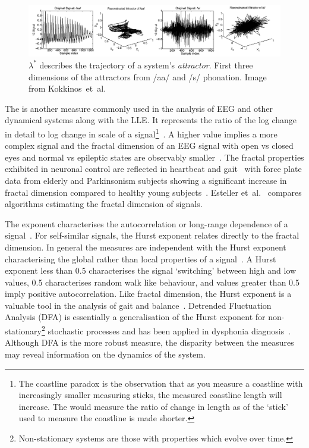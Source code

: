 \documentclass[12pt, twoside]{book}
\renewcommand\emph[1]{\textit{\color{USred}{#1}}}
\begin{document}
\begin{figure}[h]
	\label{LLE}
	\centering\centerline{\includegraphics[width=1.2\linewidth]{attractor.png}}
	\caption{$\lambda^*$ describes the trajectory of a system's \textit{attractor}. First three dimensions of the attractors from /aa/ and /s/ phonation. Image from Kokkinos~et~al.~\cite{kokkinos2005nonlinearlyapunov} }
\end{figure}




The \emph{fractal dimension} is another measure commonly used in the analysis of EEG and other dynamical systems along with the LLE. It represents the ratio of the log change in detail to log change in scale of a signal\footnote{The coastline paradox is the observation that as you measure a coastline with increasingly smaller measuring sticks, the measured coastline length will increase. The \emph{fractal dimension} would measure the ratio of change in length as of the `stick' used to measure the coastline is made shorter.}~\cite{mandelbrot1967long}. A higher value implies a more complex signal and the fractal dimension of an EEG signal with open vs closed eyes and normal vs epileptic states are observably smaller~\cite{eegfractal, seizuredimensions}. The fractal properties exhibited in neuronal control are reflected in heartbeat and gait~\cite{fractalgait} with force plate data from elderly and Parkinsonism subjects showing a significant increase in fractal dimension compared to healthy young subjects~\cite{hfdcop, fractalpd, fractalbalance}. Esteller et~al.~\cite{fractaldimensions} compares algorithms estimating the fractal dimension of signals.

The \emph{Hurst} exponent characterises the autocorrelation or long-range dependence of a signal~\cite{hurst1965long}. For self-similar signals, the Hurst exponent relates directly to the fractal dimension. In general the measures are independent with the Hurst exponent characterising the global rather than local properties of a signal~\cite{hurstfractal}. A Hurst exponent less than 0.5 characterises the signal `switching' between high and low values, 0.5 characterises random walk like behaviour, and values greater than 0.5 imply positive autocorrelation. Like fractal dimension, the Hurst exponent is a valuable tool in the analysis of gait and balance~\cite{duarte2000fractal}. Detrended Fluctuation Analysis (DFA) is essentially a generalisation of the Hurst exponent for non-stationary\footnote{Non-stationary systems are those with properties which evolve over time.} stochastic processes and has been applied in dysphonia diagnosis~\cite{splittlenonlinear2007}. Although DFA is the more robust measure, the disparity between the measures may reveal information on the dynamics of the system.
\end{document}
